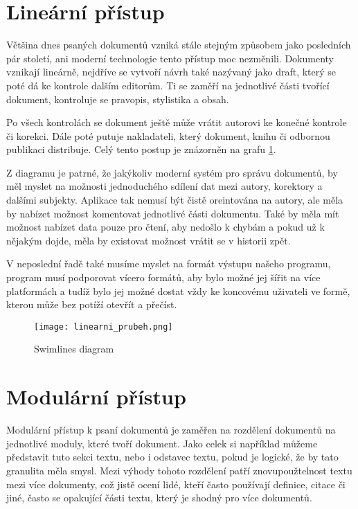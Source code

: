 \section{Lineární přístup}

Většina dnes psaných dokumentů vzniká stále stejným způsobem jako posledních pár století, ani moderní technologie tento přístup moc nezměnili.
Dokumenty vznikají lineárně, nejdříve se vytvoří návrh také nazývaný jako draft, který se poté dá ke kontrole dalším editorům. Ti se zaměří
na jednotlivé části tvořící dokument, kontroluje se pravopis, stylistika a obsah.

Po všech kontrolách se dokument ještě může vrátit autorovi ke konečné kontrole či korekci. Dále poté putuje nakladateli, který dokument,
knihu či odbornou publikaci distribuje. Celý tento postup je znázorněn na grafu \ref{fig:linflow}.

Z diagramu je patrné, že jakýkoliv moderní systém pro správu dokumentů, by měl myslet na možnosti jednoduchého sdílení dat mezi autory, korektory a dalšími
subjekty. Aplikace tak nemusí být čistě oreintována na autory, ale měla by nabízet možnost komentovat jednotlivé části dokumentu. Také by měla mít možnost
nabízet data pouze pro čtení, aby nedošlo k chybám a pokud už k nějakým dojde, měla by existovat možnost vrátit se v historii zpět.

V neposlední řadě také musíme myslet na formát výstupu našeho programu, program musí podporovat vícero formátů, aby bylo možné jej šířit na více platformách
a tudíž bylo jej možné dostat vždy ke koncovému uživateli ve formě, kterou může bez potíží otevřít a přečíst.

\begin{figure}[h]
    \centering
    \texttt{[image: linearni\_prubeh.png]}
    \caption{Swimlines diagram}
    \label{fig:linflow}
\end{figure}

\section{Modulární přístup}

Modulární přístup k psaní dokumentů je zaměřen na rozdělení dokumentů na jednotlivé moduly, které tvoří dokument. Jako celek si například můžeme představit tuto sekci
textu, nebo i odstavec textu, pokud je logické, že by tato granulita měla smysl. Mezi výhody tohoto rozdělení patří znovupoužtelnost textu mezi více dokumenty, což jistě ocení
lidé, kteří často používají definice, citace či jiné, často se opakující části textu, který je shodný pro více dokumentů.

